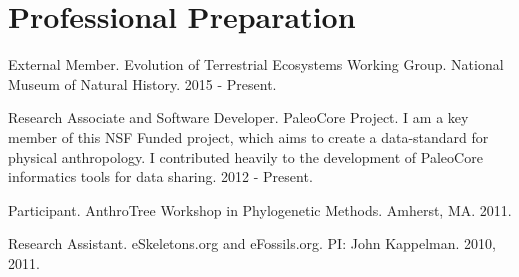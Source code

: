 \documentclass{article}
\begin{document}
\section*{Professional Preparation}
\begin{description*}

\item[] External Member. Evolution of Terrestrial Ecosystems Working Group. National Museum of Natural History. 2015 - Present.

\item[] Research Associate and Software Developer. PaleoCore Project. I am a key member of this NSF Funded project, which aims to create a data-standard for physical anthropology. I contributed heavily to the development of PaleoCore informatics tools for data sharing. 2012 - Present.

\item[] Participant. AnthroTree Workshop in Phylogenetic Methods. Amherst, MA. 2011.

\item[] Research Assistant. eSkeletons.org and eFossils.org. PI: John Kappelman. 2010, 2011.

\end{description*}
\end{document}

